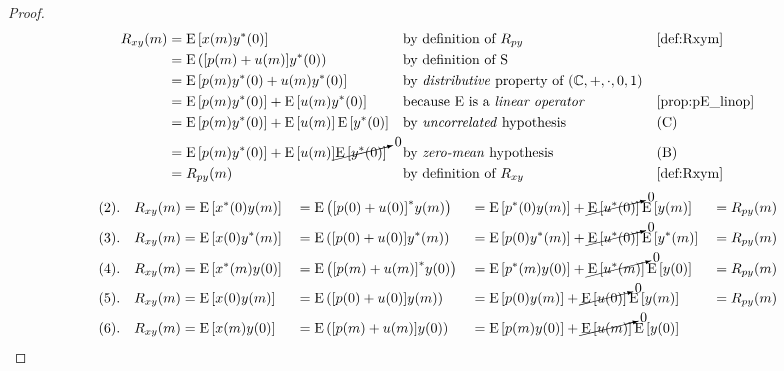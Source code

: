 \begin{proof}
\begin{align*}
  \Rxy(m)
    &\eqd \pE\brs{\rvx(m)\rvy^\ast(0)}
    && \text{by definition of $\Rpy$}
    && \text{\xref{def:Rxym}}
  \\&\eqd \pE\brp{\brs{\rvp(m)+\rvu(m)}\rvy^\ast(0)}
    && \text{by definition of $\opS$}
  \\&= \pE\brs{\rvp(m)\rvy^\ast(0)+\rvu(m)\rvy^\ast(0)}
    && \text{by \prope{distributive} property of $\fieldC$}
  \\&= \pE\brs{\rvp(m)\rvy^\ast(0)} + \pE\brs{\rvu(m)\rvy^\ast(0)}
    && \text{because $\pE$ is a \ope{linear operator}}
    && \text{\xref{prop:pE_linop}}
  \\&= \pE\brs{\rvp(m)\rvy^\ast(0)} + \pE\brs{\rvu(m)}\pE\brs{\rvy^\ast(0)}
    && \text{by \prope{uncorrelated} hypothesis}
    && \text{(C)}
  \\&= \pE\brs{\rvp(m)\rvy^\ast(0)} + \pE\brs{\rvu(m)}\cancelto{0}{\pE\brs{\rvy^\ast(0)}}
    && \text{by \prope{zero-mean} hypothesis}
    && \text{(B)}
  \\&\eqd \Rpy(m)
    && \text{by definition of $\Rxy$}
    && \text{\xref{def:Rxym}}
\end{align*}
\begin{align*}
    (2).\quad\Rxy(m)
       &\eqd \pE\brs{\rvx^\ast(0) \rvy(m)}
      &&\eqd \pE\brp{\brs{\rvp(0)+\rvu(0)}^\ast\rvy(m)}
      &&=    \pE\brs{\rvp^\ast(0)\rvy(m)} + \cancelto{0}{\pE\brs{\rvu^\ast(0)}}\pE\brs{\rvy(m)}
      &&=    \Rpy(m)
     \\
    (3).\quad\Rxy(m)
       &\eqd \pE\brs{\rvx(0)\rvy^\ast(m)}
      &&\eqd \pE\brp{\brs{\rvp(0)+\rvu(0)}\rvy^\ast(m)}
      &&=    \pE\brs{\rvp(0)\rvy^\ast(m)} + \cancelto{0}{\pE\brs{\rvu^\ast(0)}}\pE\brs{\rvy^\ast(m)}
      &&=    \Rpy(m)
     \\
    (4).\quad\Rxy(m)
       &\eqd \pE\brs{\rvx^\ast(m)\rvy(0)}
      &&\eqd \pE\brp{\brs{\rvp(m)+\rvu(m)}^\ast\rvy(0)}
      &&=    \pE\brs{\rvp^\ast(m)\rvy(0)} + \cancelto{0}{\pE\brs{\rvu^\ast(m)}}\pE\brs{\rvy(0)}
      &&=    \Rpy(m)
     \\
    (5).\quad\Rxy(m)
       &\eqd \pE\brs{\rvx(0)\rvy(m)}
      &&\eqd \pE\brp{\brs{\rvp(0)+\rvu(0)}\rvy(m)}
      &&=    \pE\brs{\rvp(0)\rvy(m)} + \cancelto{0}{\pE\brs{\rvu(0)}}\pE\brs{\rvy(m)}
      &&=    \Rpy(m)
     \\
    (6).\quad\Rxy(m)
       &\eqd \pE\brs{\rvx(m)\rvy(0)}
      &&\eqd \pE\brp{\brs{\rvp(m)+\rvu(m)}\rvy(0)}
      &&=    \pE\brs{\rvp(m)\rvy(0)} + \cancelto{0}{\pE\brs{\rvu(m)}}\pE\brs{\rvy(0)}

\end{align*}
\end{proof}
